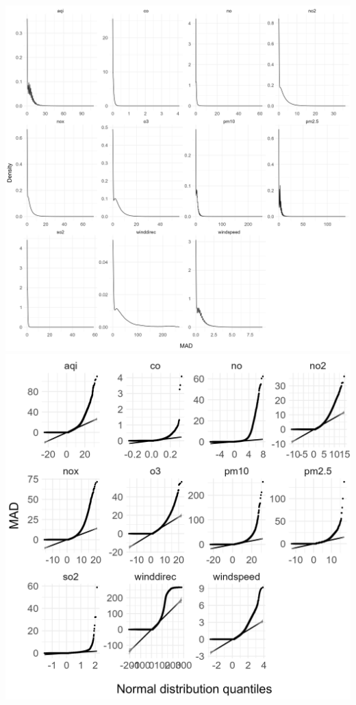 \documentclass[./report.tex]{subfiles}
\begin{document}
\begin{enumerate}
    \includegraphics[width=6in]{plots/question7/density.png}
    \includegraphics[width=6in]{plots/question7/qq.png}
\end{enumerate}
\end{document}

